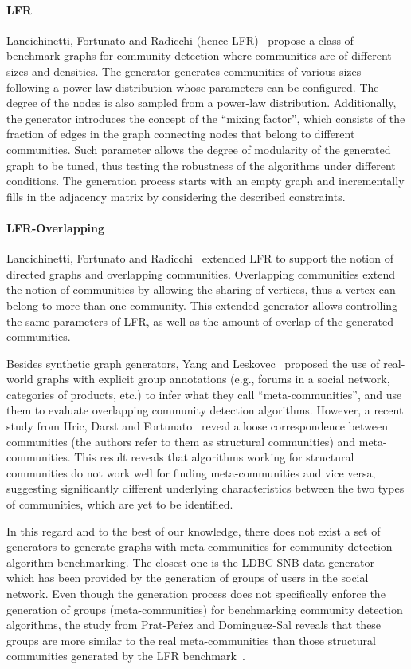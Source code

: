 \paragraph{LFR} Lancichinetti, Fortunato
and Radicchi (hence LFR)~\cite{PhysRevE.78.046110} propose a class of benchmark
graphs for community detection where communities are of different sizes and
densities. The generator generates communities of various sizes following a
power-law distribution whose parameters can be configured. The degree of the
nodes is also sampled from a power-law distribution. Additionally, the generator
introduces the concept of the ``mixing factor'', which consists of the fraction of
edges in the graph connecting nodes that belong to different communities. Such parameter
allows  the degree of modularity of the generated graph  to be tuned, thus
testing the robustness of the algorithms under different conditions. The
generation process starts with an empty graph and incrementally fills in the
adjacency matrix by considering the described constraints.

\paragraph{LFR-Overlapping} Lancichinetti, Fortunato and
Radicchi~\cite{PhysRevE.80.016118} extended LFR to support the notion of
directed graphs and overlapping communities. Overlapping communities extend the
notion of communities by allowing the sharing of vertices, thus a vertex can
belong to more than one community. This extended generator allows controlling
the same parameters of LFR, as well as the amount of overlap of
the generated communities.

Besides synthetic graph generators, Yang and Leskovec~\cite{yang2015defining}
proposed the use of real-world graphs with explicit group annotations (e.g.,
forums in a social network, categories of products, etc.) to infer what they
call ``meta-communities'', and use them to evaluate overlapping community
detection algorithms. However, a recent study from Hric, Darst and
Fortunato~\cite{hric2014community} reveal a loose correspondence between
communities (the authors refer to them as structural communities) and
meta-communities.  This result reveals that  algorithms working for structural
communities do not work well for finding meta-communities and vice versa,
suggesting significantly different underlying characteristics
between the two types of communities, which are yet to be
identified.

In this regard and to the best of our knowledge, there does not exist a set of
generators to generate graphs with meta-communities for community detection
algorithm benchmarking. The closest one is the LDBC-SNB data
generator~\cite{Erling:2015:LSN:2723372.2742786} which has been provided by the
generation of groups of users in the social network. Even though the generation
process does not specifically enforce the generation of groups
(meta-communities) for benchmarking community detection algorithms, the study
from Prat-Pe\'rez and Dominguez-Sal reveals that these groups are more similar
to the real meta-communities than those structural communities generated by the
LFR benchmark~\cite{Prat-Perez:2014:CSS:2621934.2621942}.

